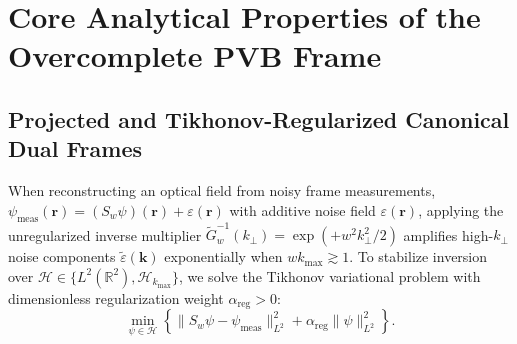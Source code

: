 \documentclass[aps,pra,reprint,amsmath,amssymb,floatfix,longbibliography]{revtex4-2}
\providecommand{\norm}[1]{\lVert#1\rVert}
\begin{document}
\section{Core Analytical Properties of the Overcomplete PVB Frame}
\label{sec:properties}

\subsection{Projected and Tikhonov-Regularized Canonical Dual Frames}
\label{subsec:tikhonov_dual}

When reconstructing an optical field from noisy frame measurements, $\psi_{\mathrm{meas}}(\mathbf{r}) = (S_w\psi)(\mathbf{r}) + \varepsilon(\mathbf{r})$ with additive noise field $\varepsilon(\mathbf{r})$, applying the unregularized inverse multiplier $\widetilde{G}_w^{-1}(k_\perp) = \exp(+w^2 k_\perp^2/2)$ amplifies high-$k_\perp$ noise components $\widetilde{\varepsilon}(\mathbf{k})$ exponentially when $w k_{\max} \gtrsim 1$. To stabilize inversion over $\mathcal{H} \in \{L^2(\mathbb{R}^2), \mathcal{H}_{k_{\max}}\}$, we solve the Tikhonov variational problem with dimensionless regularization weight $\alpha_{\mathrm{reg}} > 0$:
\begin{equation}
\min_{\psi \in \mathcal{H}} \left\{ \norm{S_w\psi - \psi_{\mathrm{meas}}}_{L^2}^2 + \alpha_{\mathrm{reg}}\norm{\psi}_{L^2}^2 \right\}.
\label{eq:tikhonov_opt}
\end{equation}
\end{document}
